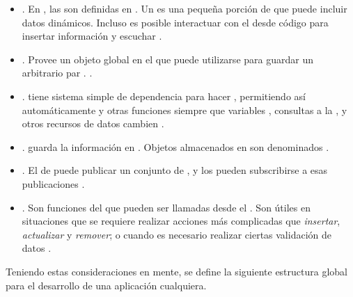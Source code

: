 	\begin{itemize}
		\item
			\textbf{\templatesMETEOR}. En \meteorNAME, las \viewsAS son definidas en \templatesMETEOR. Un \templateMETEOR es una pequeña porción de \htmlNAME que puede incluir datos dinámicos. Incluso es posible interactuar con el \templateMETEOR desde código \javaScriptNAME para insertar información y escuchar \events \cite{online_meteor_documentation}.
		\item
			\textbf{\sessionMETEOR}. Provee un objeto global en el \clientAS que puede utilizarse para guardar un arbitrario par \keyValueDB. \cite{online_meteor_documentation}.
		\item
			\textbf{\trackerMETEOR}. \meteorNAME tiene sistema simple de dependencia para hacer \trackingMETEOR, permitiendo así automáticamente \rerunCPT \templatesMETEOR y otras funciones siempre que variables \sessionMETEOR, consultas a la \dataBasesDB, y otros recursos de datos cambien \cite{online_meteor_documentation}.
		\item
			\textbf{\collectionsMETEOR}. \meteorNAME guarda la información en \collectionsMETEOR. Objetos \javaScriptNAME almacenados en \collectionsMETEOR son denominados \documentsDB \cite{online_meteor_documentation}.

		\item
			\textbf{\publishsubscribeMETEOR}. El \serverAS de \meteorNAME puede publicar un conjunto de \documentsDB , y los \clientsAS pueden subscribirse a esas publicaciones \cite{online_meteor_documentation}.
		\item
			\textbf{\methodsMETEOR}\label{cap:arquitectura:section:generic_architecture_structure:itemize:methods_meteor}. Son funciones del \serverSideAS que pueden ser llamadas desde el \clientSideAS. Son útiles en situaciones que se requiere realizar acciones más complicadas que \textit{insertar}, \textit{actualizar} y \textit{remover}; o cuando es necesario realizar ciertas validación de datos \cite{online_meteor_documentation}.
	\end{itemize}

Teniendo estas consideraciones en mente, se define la siguiente estructura global para el desarrollo de una aplicación cualquiera.



